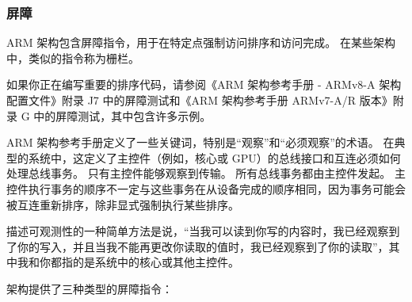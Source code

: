 \subsubsection{屏障}

ARM 架构包含屏障指令，用于在特定点强制访问排序和访问完成。
在某些架构中，类似的指令称为栅栏。

如果你正在编写重要的排序代码，请参阅《ARM 架构参考手册 -
ARMv8-A 架构配置文件》附录 J7 中的屏障测试和《ARM 架构参考手册
ARMv7-A/R 版本》附录 G 中的屏障测试，其中包含许多示例。

ARM 架构参考手册定义了一些关键词，特别是“观察”和“必须观察”的术语。
在典型的系统中，这定义了主控件（例如，核心或 GPU）的总线接口和互连必须如何处理总线事务。
只有主控件能够观察到传输。
所有总线事务都由主控件发起。
主控件执行事务的顺序不一定与这些事务在从设备完成的顺序相同，因为事务可能会被互连重新排序，除非显式强制执行某些排序。

描述可观测性的一种简单方法是说，“当我可以读到你写的内容时，我已经观察到了你的写入，并且当我不能再更改你读取的值时，我已经观察到了你的读取”，其中我和你都指的是系统中的核心或其他主控件。

架构提供了三种类型的屏障指令：

